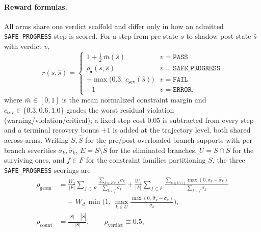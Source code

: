 \documentclass[letterpaper]{article} %
\begin{document}
\paragraph{Reward formulas.}
All arms share one verdict scaffold and differ only in how an admitted \texttt{SAFE\_PROGRESS} step is scored. For a step from pre-state $s$ to shadow post-state $\hat s$ with verdict $v$,
\begin{equation}
r(s,\hat s)=
\begin{cases}
1+\tfrac12\,\bar m(\hat s) & v=\texttt{PASS}\\[1pt]
\rho_{\bullet}(s,\hat s) & v=\texttt{SAFE\_PROGRESS}\\[1pt]
-\max\!\big(0.3,\,c_{\mathrm{sev}}(\hat s)\big) & v=\texttt{FAIL}\\[1pt]
-1 & v=\texttt{ERROR,}
\end{cases}
\label{eq:reward-scaffold}
\end{equation}
where $\bar m\in[0,1]$ is the mean normalized constraint margin and $c_{\mathrm{sev}}\in\{0.3,0.6,1.0\}$ grades the worst residual violation (warning/violation/critical); a fixed step cost $0.05$ is subtracted from every step and a terminal recovery bonus $+1$ is added at the trajectory level, both shared across arms. Writing $S,\hat S$ for the pre/post overloaded-branch supports with per-branch severities $\sigma_k,\hat\sigma_k$, $E=S\setminus\hat S$ for the eliminated branches, $U=S\cap\hat S$ for the surviving ones, and $f\in F$ for the constraint families partitioning $S$, the three \texttt{SAFE\_PROGRESS} scorings are
\begin{align}
\rho_{\mathrm{geom}} &= \tfrac{W_2}{|F|}\!\sum_{f\in F}\!\frac{\sum_{k\in E\cap f}\sigma_k}{\sum_{k\in f}\sigma_k}
+\tfrac{W_3}{|F|}\!\sum_{f\in F}\!\frac{\sum_{k\in U\cap f}\max(0,\sigma_k-\hat\sigma_k)}{\sum_{k\in f}\sigma_k}
\nonumber\\[-1pt]
&\quad-\,W_d\,\min\!\Big(1,\,\max_{k\in U}\tfrac{\max(0,\,\hat\sigma_k-\sigma_k)}{\sigma_k}\Big),
\label{eq:rho-geom}\\[2pt]
\rho_{\mathrm{count}} &= \frac{|S|-|\hat S|}{|S|},
\qquad
\rho_{\mathrm{verdict}} \equiv 0.5,
\label{eq:rho-count}
\end{align}
\end{document}
